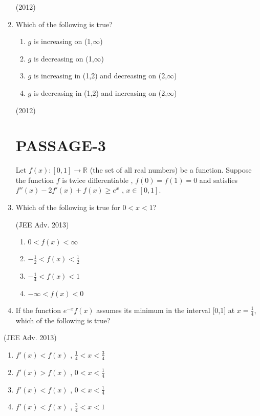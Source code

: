 \documentclass[journal,,12pt,twocolumn]{IEEEtran}
\theoremstyle{remark}
\begin{document}
\begin{enumerate}
\hfill{(2012)}



\item Which of the following is true?
\begin{enumerate}[label=(\alph*)]
\item $g$ is increasing on (1,$\infty$)
\item $g$ is decreasing on (1,$\infty$)
\item $g$ is increasing in (1,2) and decreasing on (2,$\infty$)
\item $g$ is decreasing in (1,2) and increasing on (2,$\infty$)
\end{enumerate}
\hfill{(2012)}

\section*{PASSAGE-3}
Let $f(x) : [0,1] \to\mathbb{R}$
(the set of all real numbers) be a function. Suppose the function $f$ is twice differentiable , $f(0)=f(1)=0$ and satisfies $f''(x)-2f'(x)+f(x) \geq e^x$ , $x \in [0,1]$.

\item Which of the following is true for $0<x<1$?


\hfill{(JEE Adv. 2013)}

\begin{enumerate}[label=(\alph*)]
\item $0<f(x)< \infty$
\item $ -\frac{1}{2} <f(x)< \frac{1}{2}$
\item $-\frac{1}{4}<f(x)<1$
\item $-\infty <f(x)<0$
\end{enumerate}


\item If the function $e^{-x}f(x)$ assumes its minimum in the interval [0,1] at $x=\frac{1}{4}$, which of the following is true?
\end{enumerate}

\hfill{(JEE Adv. 2013)}

\begin{enumerate}[label=(\alph*)]
\item $f'(x)<f(x)$ , $\frac{1}{4}<x<\frac{3}{4}$ \\

\item $f'(x)>f(x)$ , $0<x<\frac{1}{4}$ \\ 

\item $f'(x)<f(x)$ , $0<x<\frac{1}{4}$ \\

\item $f'(x)<f(x)$ , $\frac{3}{4}<x<1$ \\
\end{enumerate}
\end{document}
